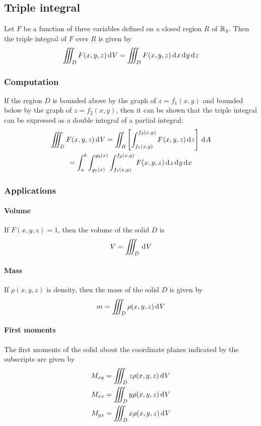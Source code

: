 \documentclass[10pt, twocolumn]{article}
\theoremstyle{remark}
\begin{document}
\subsection{Triple integral}
Let \(F\) be a function of three variables defined on a closed region \(R\) of \(\mathbb{R}_{3}^{}\).
Then the triple integral of \(F\) over \(R\) is given by
\[
  \iiint_D {F(x, y, z) \,\mathrm{d}^{} V} = \iiint_D {F(x, y, z) \,\mathrm{d}^{} x \,\mathrm{d}^{} y \,\mathrm{d}^{} z}
\]

\subsubsection*{Computation}
If the region \(D\) is bounded above by the graph of \(z = f_1 (x, y)\) and bounded below by the graph of \(z = f_2 (x, y)\), then it can be shown that the triple integral can be expressed as a double integral of a partial integral:
\begin{multline*}
  \iiint_D {F(x, y, z) \,\mathrm{d}^{} V} = \iint_R \left[ \int_{f_1 (x, y)}^{f_2 (x, y)}{F(x, y, z) \,\mathrm{d}^{} z} \right] \,\mathrm{d}^{} A                            \\
  = \int_a ^b {\int_{g_1 (x)}^{g_2 (x)}{\int_{f_1 (x, y)}^{f_2 (x, y)}{F(x, y, z) \,\mathrm{d}^{} z}\,\mathrm{d}^{} y}\,\mathrm{d}^{} x}
\end{multline*}

\subsubsection*{Applications}
\paragraph*{Volume}
If \(F(x, y, z) = 1\), then the volume of the solid \(D\) is
\[
  V = \iiint_D {\,\mathrm{d}^{} V}
\]

\paragraph*{Mass}
If \(\rho(x, y, z)\) is density, then the mass of the solid \(D\) is given by
\[
  m = \iiint_D {\rho(x, y, z) \,\mathrm{d}^{} V}
\]

\paragraph*{First moments}
The first moments of the solid about the coordinate planes indicated by the subscripts are given by
\begin{align*}
  M_{xy} & = \iiint_D {z\rho(x, y, z) \,\mathrm{d}^{} V} \\
  M_{xz} & = \iiint_D {y\rho(x, y, z) \,\mathrm{d}^{} V} \\
  M_{yz} & = \iiint_D {x\rho(x, y, z) \,\mathrm{d}^{} V}
\end{align*}
\end{document}
